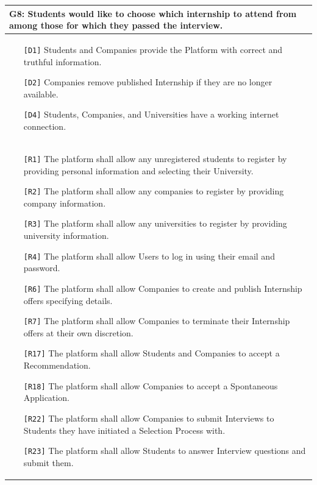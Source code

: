 \begin{table}[H]
    \centering
    \begin{tabular}{|p{15cm}|}
        \hline
        \textbf{G8:} Students would like to choose which internship to attend from among those for which they passed the interview. \\ \hline
        \begin{itemize}
            \item[\texttt{[D1]}] Students and Companies provide the Platform with correct and truthful information.
            \item[\texttt{[D2]}] Companies remove published Internship if they are no longer available. 
            \item[\texttt{[D4]}] Students, Companies, and Universities have a working internet connection.
        \end{itemize} \\ \hline
        \begin{itemize}
            \item[\texttt{[R1]}] The platform shall allow any unregistered students to register by providing personal information and selecting their University.
            \item[\texttt{[R2]}] The platform shall allow any companies to register by providing company information.
            \item[\texttt{[R3]}] The platform shall allow any universities to register by providing university information.
            \item[\texttt{[R4]}] The platform shall allow Users to log in using their email and password.
            \item[\texttt{[R6]}] The platform shall allow Companies to create and publish Internship offers specifying details.
            \item[\texttt{[R7]}] The platform shall allow Companies to terminate their Internship offers at their own discretion.
            \item[\texttt{[R17]}] The platform shall allow Students and Companies to accept a Recommendation.
            \item[\texttt{[R18]}] The platform shall allow Companies to accept a Spontaneous Application.
            \item[\texttt{[R22]}] The platform shall allow Companies to submit Interviews to Students they have initiated a Selection Process with.
            \item[\texttt{[R23]}] The platform shall allow Students to answer Interview questions and submit them.

\end{itemize}
\end{tabular}
\end{table}
